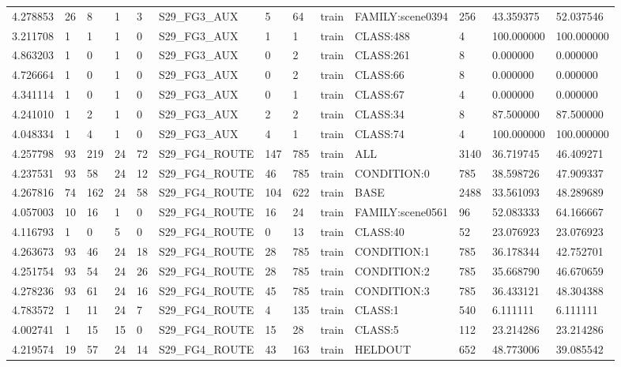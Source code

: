 \begin{tabular}{lllllllllllll}
4.278853 & 26 & 8 & 1 & 3 & S29\_FG3\_AUX & 5 & 64 & train & FAMILY:scene0394 & 256 & 43.359375 & 52.037546 \\
3.211708 & 1 & 1 & 1 & 0 & S29\_FG3\_AUX & 1 & 1 & train & CLASS:488 & 4 & 100.000000 & 100.000000 \\
4.863203 & 1 & 0 & 1 & 0 & S29\_FG3\_AUX & 0 & 2 & train & CLASS:261 & 8 & 0.000000 & 0.000000 \\
4.726664 & 1 & 0 & 1 & 0 & S29\_FG3\_AUX & 0 & 2 & train & CLASS:66 & 8 & 0.000000 & 0.000000 \\
4.341114 & 1 & 0 & 1 & 0 & S29\_FG3\_AUX & 0 & 1 & train & CLASS:67 & 4 & 0.000000 & 0.000000 \\
4.241010 & 1 & 2 & 1 & 0 & S29\_FG3\_AUX & 2 & 2 & train & CLASS:34 & 8 & 87.500000 & 87.500000 \\
4.048334 & 1 & 4 & 1 & 0 & S29\_FG3\_AUX & 4 & 1 & train & CLASS:74 & 4 & 100.000000 & 100.000000 \\
4.257798 & 93 & 219 & 24 & 72 & S29\_FG4\_ROUTE & 147 & 785 & train & ALL & 3140 & 36.719745 & 46.409271 \\
4.237531 & 93 & 58 & 24 & 12 & S29\_FG4\_ROUTE & 46 & 785 & train & CONDITION:0 & 785 & 38.598726 & 47.909337 \\
4.267816 & 74 & 162 & 24 & 58 & S29\_FG4\_ROUTE & 104 & 622 & train & BASE & 2488 & 33.561093 & 48.289689 \\
4.057003 & 10 & 16 & 1 & 0 & S29\_FG4\_ROUTE & 16 & 24 & train & FAMILY:scene0561 & 96 & 52.083333 & 64.166667 \\
4.116793 & 1 & 0 & 5 & 0 & S29\_FG4\_ROUTE & 0 & 13 & train & CLASS:40 & 52 & 23.076923 & 23.076923 \\
4.263673 & 93 & 46 & 24 & 18 & S29\_FG4\_ROUTE & 28 & 785 & train & CONDITION:1 & 785 & 36.178344 & 42.752701 \\
4.251754 & 93 & 54 & 24 & 26 & S29\_FG4\_ROUTE & 28 & 785 & train & CONDITION:2 & 785 & 35.668790 & 46.670659 \\
4.278236 & 93 & 61 & 24 & 16 & S29\_FG4\_ROUTE & 45 & 785 & train & CONDITION:3 & 785 & 36.433121 & 48.304388 \\
4.783572 & 1 & 11 & 24 & 7 & S29\_FG4\_ROUTE & 4 & 135 & train & CLASS:1 & 540 & 6.111111 & 6.111111 \\
4.002741 & 1 & 15 & 15 & 0 & S29\_FG4\_ROUTE & 15 & 28 & train & CLASS:5 & 112 & 23.214286 & 23.214286 \\
4.219574 & 19 & 57 & 24 & 14 & S29\_FG4\_ROUTE & 43 & 163 & train & HELDOUT & 652 & 48.773006 & 39.085542 \\

\end{tabular}

